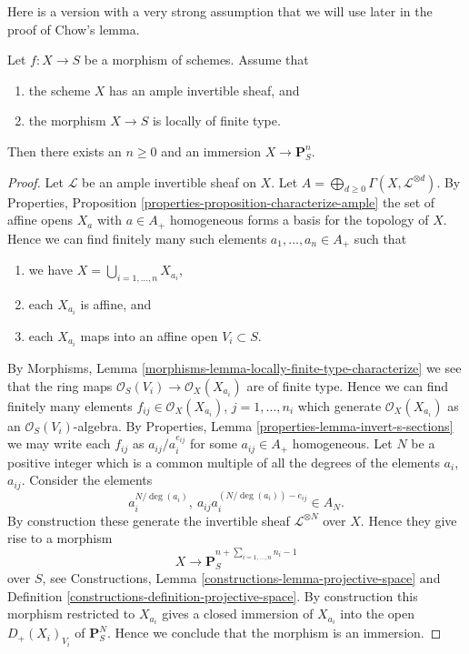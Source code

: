 \noindent
Here is a version with a very strong assumption that we will use later
in the proof of Chow's lemma.

\begin{lemma}
\label{lemma-quasi-projective-finite-type-over-S}
Let $f : X \to S$ be a morphism of schemes.
Assume that
\begin{enumerate}
\item the scheme $X$ has an ample invertible sheaf, and
\item the morphism $X \to S$ is locally of finite type.
\end{enumerate}
Then there exists an $n \geq 0$ and an immersion $X \to \mathbf{P}^n_S$.
\end{lemma}

\begin{proof}
Let $\mathcal{L}$ be an ample invertible sheaf on $X$.
Let $A = \bigoplus_{d \geq 0} \Gamma(X, \mathcal{L}^{\otimes d})$.
By Properties, Proposition \ref{properties-proposition-characterize-ample}
the set of affine opens $X_a$ with $a \in A_{+}$ homogeneous forms
a basis for the topology of $X$. Hence we can find finitely
many such elements $a_1, \ldots, a_n \in A_{+}$ such that
\begin{enumerate}
\item we have $X = \bigcup_{i = 1, \ldots, n} X_{a_i}$,
\item each $X_{a_i}$ is affine, and
\item each $X_{a_i}$ maps into an affine open $V_i \subset S$.
\end{enumerate}
By Morphisms, Lemma \ref{morphisms-lemma-locally-finite-type-characterize}
we see that the ring maps
$\mathcal{O}_S(V_i) \to \mathcal{O}_X(X_{a_i})$ are
of finite type. Hence we can find finitely many
elements $f_{ij} \in \mathcal{O}_X(X_{a_i})$, $j = 1, \ldots, n_i$
which generate $\mathcal{O}_X(X_{a_i})$ as an $\mathcal{O}_S(V_i)$-algebra.
By Properties, Lemma \ref{properties-lemma-invert-s-sections}
we may write each
$f_{ij}$ as $a_{ij}/a_i^{e_{ij}}$ for some
$a_{ij} \in A_{+}$ homogeneous. Let $N$ be a positive integer which
is a common multiple of all the degrees of the elements
$a_i$, $a_{ij}$. Consider the elements
$$
a_i^{N/\deg(a_i)},\ a_{ij}a_i^{(N/\deg(a_i)) - e_{ij}} \in A_N.
$$
By construction these generate the invertible sheaf
$\mathcal{L}^{\otimes N}$ over $X$. Hence they give rise
to a morphism
$$
X \longrightarrow \mathbf{P}_S^{n + \sum_{i = 1, \ldots, n} n_i - 1}
$$
over $S$, see Constructions, Lemma \ref{constructions-lemma-projective-space}
and Definition \ref{constructions-definition-projective-space}.
By construction this morphism restricted to $X_{a_i}$
gives a closed immersion of $X_{a_i}$ into the open
$D_{+}(X_i)_{V_i}$ of $\mathbf{P}^N_S$. Hence we conclude that the morphism
is an immersion.
\end{proof}

